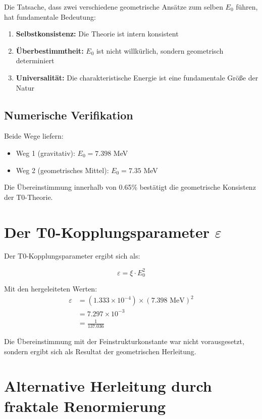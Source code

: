 \documentclass[12pt,a4paper]{article}
\theoremstyle{definition}
\begin{document}
	Die Tatsache, dass zwei verschiedene geometrische Ans\"atze zum selben $E_0$ f\"uhren, hat fundamentale Bedeutung:
	
	\begin{enumerate}
		\item \textbf{Selbstkonsistenz:} Die Theorie ist intern konsistent
		\item \textbf{\"Uberbestimmtheit:} $E_0$ ist nicht willk\"urlich, sondern geometrisch determiniert
		\item \textbf{Universalit\"at:} Die charakteristische Energie ist eine fundamentale Gr\"o\ss e der Natur
	\end{enumerate}
	
	\subsection{Numerische Verifikation}
	
	Beide Wege liefern:
	\begin{itemize}
		\item Weg 1 (gravitativ): $E_0 = 7.398$ MeV
		\item Weg 2 (geometrisches Mittel): $E_0 = 7.35$ MeV
	\end{itemize}
	
	Die \"Ubereinstimmung innerhalb von 0.65\% best\"atigt die geometrische Konsistenz der T0-Theorie.
	
	\section{Der T0-Kopplungsparameter $\varepsilon$}
	
	Der T0-Kopplungsparameter ergibt sich als:
	
	\begin{equation}
		\varepsilon = \xi \cdot E_0^2
	\end{equation}
	
	Mit den hergeleiteten Werten:
	\begin{align}
		\varepsilon &= (1.333 \times 10^{-4}) \times (7.398 \text{ MeV})^2\\
		&= 7.297 \times 10^{-3}\\
		&= \frac{1}{137.036}
	\end{align}
	
	Die \"Ubereinstimmung mit der Feinstrukturkonstante war nicht vorausgesetzt, sondern ergibt sich als Resultat der geometrischen Herleitung.
	
	\section{Alternative Herleitung durch fraktale Renormierung}
	
\end{document}
